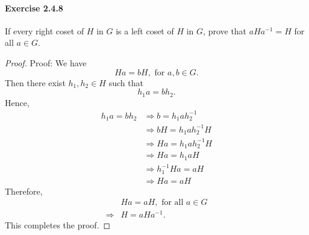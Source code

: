 \documentclass{article}
\begin{document}
\paragraph{Exercise 2.4.8} If every right coset of $H$ in $G$ is a left coset of $H$ in $G$, prove that $aHa^{-1} = H$ for all $a \in G$.
\begin{proof}
    Proof: We have
$$
H a=b H, \text { for } a, b \in G .
$$
Then there exist $h_1, h_2 \in H$ such that
$$
h_1 a=b h_2 .
$$
Hence,
$$
\begin{aligned}
h_1 a=b h_2 & \Longrightarrow b=h_1 a h_2^{-1} \\
& \Longrightarrow b H=h_1 a h_2^{-1} H \\
& \Longrightarrow H a=h_1 a h_2^{-1} H \\
& \Longrightarrow H a=h_1 a H \\
& \Longrightarrow h_1^{-1} H a=a H \\
& \Longrightarrow H a=a H
\end{aligned}
$$
Therefore,
$$
\begin{aligned}
& H a=a H, \text { for all } a \in G \\
\Longrightarrow & H=a H a^{-1} .
\end{aligned}
$$
This completes the proof.
\end{proof}
\end{document}
